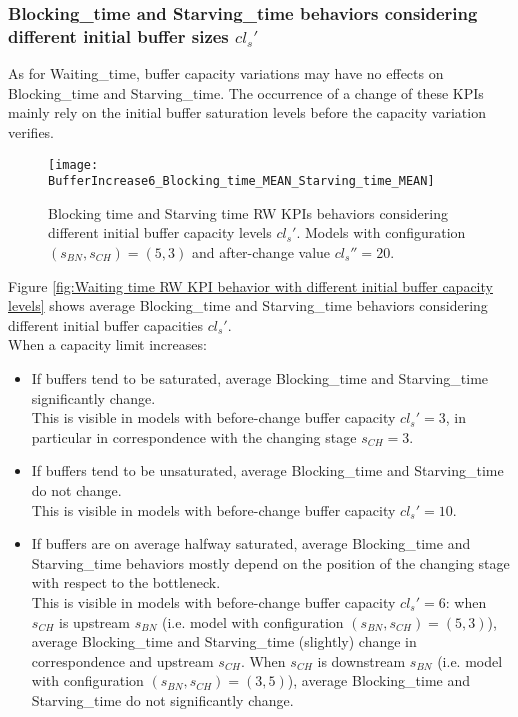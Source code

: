 \subsubsection{Blocking\_time and Starving\_time behaviors considering different initial buffer sizes $cl_s'$}
As for Waiting\_time, buffer capacity variations may have no effects on Blocking\_time and Starving\_time. The occurrence of a change of these KPIs mainly rely on the initial buffer saturation levels before the capacity variation verifies. 
\begin{figure}[h] 
\centering
\texttt{[image: BufferIncrease6\_Blocking\_time\_MEAN\_Starving\_time\_MEAN]}
\caption[Blocking time and Starving time RW KPIs behaviors with different initial buffer capacity levels]{Blocking time and Starving time RW KPIs behaviors considering different initial buffer capacity levels $cl_s'$. Models with configuration $(s_{BN},s_{CH})=(5,3)$ and after-change value $cl_s''=20$.}
\label{fig:Blocking time and Starving time RW KPIs behaviors with different initial buffer capacity levels}
\end{figure}
Figure \ref{fig:Waiting time RW KPI behavior with different initial buffer capacity levels} shows average Blocking\_time and Starving\_time behaviors considering different initial buffer capacities $cl_s'$. \\When a capacity limit increases:
\begin{itemize}
\item If buffers tend to be saturated, average Blocking\_time and Starving\_time significantly change. \\This is visible in models with before-change buffer capacity $cl_s'=3$, in particular in correspondence with the changing stage $s_{CH}=3$.
\item If buffers tend to be unsaturated, average Blocking\_time and Starving\_time do not change. \\This is visible in models with before-change buffer capacity $cl_s'=10$.
\item If buffers are on average halfway saturated, average Blocking\_time and Starving\_time behaviors mostly depend on the position of the changing stage with respect to the bottleneck. \\This is visible in models with before-change buffer capacity $cl_s'=6$: when $s_{CH}$ is upstream $s_{BN}$ (i.e. model with configuration $(s_{BN},s_{CH})=(5,3)$), average Blocking\_time and Starving\_time (slightly) change in correspondence and upstream $s_{CH}$. When $s_{CH}$ is downstream $s_{BN}$ (i.e. model with configuration $(s_{BN},s_{CH})=(3,5)$), average Blocking\_time and Starving\_time do not significantly change.
\end{itemize}
